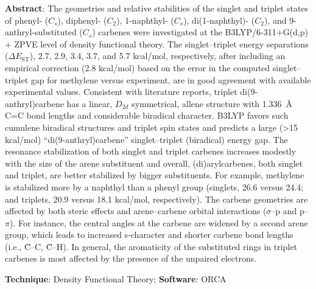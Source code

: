\documentclass[10pt]{article}
\begin{document}
\begin{enumerate}
          \textbf{Abstract}: The geometries and relative stabilities of the singlet and triplet states of phenyl- (\(C_s\)), diphenyl- (\(C_2\)), 1-naphthyl- (\(C_s\)), di(1-naphthyl)- (\(C_2\)), and 9-anthryl-substituted (\(C_s\)) carbenes were investigated at the B3LYP/6-311+G(d,p) + ZPVE level of density functional theory. The singlet--triplet energy separations (\(\Delta E_\mathrm{ST}\)), 2.7, 2.9, 3.4, 3.7, and 5.7 kcal/mol, respectively, after including an empirical correction (2.8 kcal/mol) based on the error in the computed singlet--triplet gap for methylene versus experiment, are in good agreement with available experimental values. Consistent with literature reports, triplet di(9-anthryl)carbene has a linear, \(D_{2d}\) symmetrical, allene structure with \SI{1.336}{\angstrom} C=C bond lengths and considerable biradical character. B3LYP favors such cumulene biradical structures and triplet spin states and predicts a large (>15 kcal/mol) “di(9-anthryl)carbene” singlet--triplet (biradical) energy gap. The resonance stabilization of both singlet and triplet carbenes increases modestly with the size of the arene substituent and overall, (di)arylcarbenes, both singlet and triplet, are better stabilized by bigger substituents. For example, methylene is stabilized more by a naphthyl than a phenyl group (singlets, 26.6 versus 24.4; and triplets, 20.9 versus 18.1 kcal/mol, respectively). The carbene geometries are affected by both steric effects and arene--carbene orbital interactions (\(\sigma\)--p and p--\(\pi\)). For instance, the central angles at the carbene are widened by a second arene group, which leads to increased s-character and shorter carbene bond lengths (i.e., \"{C}--C, \"{C}--H). In general, the aromaticity of the substituted rings in triplet carbenes is most affected by the presence of the unpaired electrons.

          \textbf{Technique}: Density Functional Theory; \textbf{Software}: ORCA

\end{enumerate}
\end{document}
